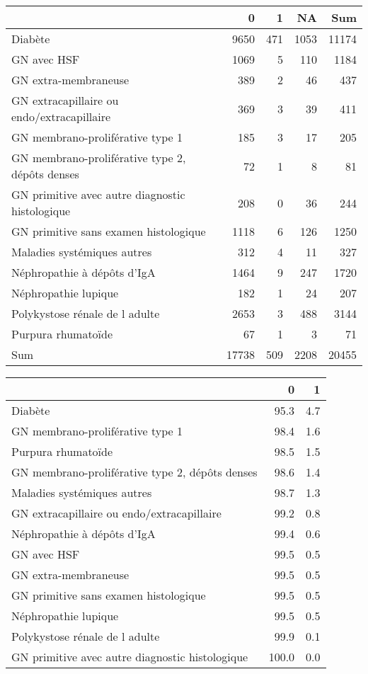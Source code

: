 \documentclass[11pt,a4paper]{article}\usepackage[]{graphicx}\usepackage[]{color}
\begin{document}
\begin{table}[H]
\centering
\begin{tabular}{lrrrr}
  \hline
 & 0 & 1 & NA & Sum \\ 
  \hline
Diabète & 9650 & 471 & 1053 & 11174 \\ 
  GN avec HSF & 1069 & 5 & 110 & 1184 \\ 
  GN extra-membraneuse & 389 & 2 & 46 & 437 \\ 
  GN extracapillaire ou endo/extracapillaire & 369 & 3 & 39 & 411 \\ 
  GN membrano-proliférative type 1 & 185 & 3 & 17 & 205 \\ 
  GN membrano-proliférative type 2, dépôts denses & 72 & 1 & 8 & 81 \\ 
  GN primitive avec autre diagnostic histologique & 208 & 0 & 36 & 244 \\ 
  GN primitive sans examen histologique & 1118 & 6 & 126 & 1250 \\ 
  Maladies systémiques autres & 312 & 4 & 11 & 327 \\ 
  Néphropathie à dépôts d'IgA & 1464 & 9 & 247 & 1720 \\ 
  Néphropathie lupique & 182 & 1 & 24 & 207 \\ 
  Polykystose rénale de l adulte & 2653 & 3 & 488 & 3144 \\ 
  Purpura rhumatoïde & 67 & 1 & 3 & 71 \\ 
  Sum & 17738 & 509 & 2208 & 20455 \\ 
   \hline
\end{tabular}
\end{table}
\begin{table}[H]
\centering
\begin{tabular}{lrr}
  \hline
 & 0 & 1 \\ 
  \hline
Diabète & 95.3 & 4.7 \\ 
  GN membrano-proliférative type 1 & 98.4 & 1.6 \\ 
  Purpura rhumatoïde & 98.5 & 1.5 \\ 
  GN membrano-proliférative type 2, dépôts denses & 98.6 & 1.4 \\ 
  Maladies systémiques autres & 98.7 & 1.3 \\ 
  GN extracapillaire ou endo/extracapillaire & 99.2 & 0.8 \\ 
  Néphropathie à dépôts d'IgA & 99.4 & 0.6 \\ 
  GN avec HSF & 99.5 & 0.5 \\ 
  GN extra-membraneuse & 99.5 & 0.5 \\ 
  GN primitive sans examen histologique & 99.5 & 0.5 \\ 
  Néphropathie lupique & 99.5 & 0.5 \\ 
  Polykystose rénale de l adulte & 99.9 & 0.1 \\ 
  GN primitive avec autre diagnostic histologique & 100.0 & 0.0 \\ 
   \hline
\end{tabular}
\end{table}
\end{document}
